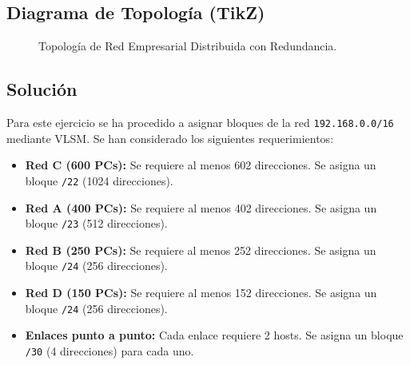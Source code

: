 \documentclass[a4paper,12pt]{article}
\begin{document}
\subsection{Diagrama de Topología (TikZ)}
\begin{figure}[H]
  \centering
  \caption{Topología de Red Empresarial Distribuida con Redundancia.}
\end{figure}

\subsection{Solución}
Para este ejercicio se ha procedido a asignar bloques de la red \texttt{192.168.0.0/16} mediante VLSM. Se han considerado los siguientes requerimientos:
\begin{itemize}
  \item \textbf{Red C (600 PCs):} Se requiere al menos 602 direcciones. Se asigna un bloque \texttt{/22} (1024 direcciones).
  \item \textbf{Red A (400 PCs):} Se requiere al menos 402 direcciones. Se asigna un bloque \texttt{/23} (512 direcciones).
  \item \textbf{Red B (250 PCs):} Se requiere al menos 252 direcciones. Se asigna un bloque \texttt{/24} (256 direcciones).
  \item \textbf{Red D (150 PCs):} Se requiere al menos 152 direcciones. Se asigna un bloque \texttt{/24} (256 direcciones).
  \item \textbf{Enlaces punto a punto:} Cada enlace requiere 2 hosts. Se asigna un bloque \texttt{/30} (4 direcciones) para cada uno.
\end{itemize}
\end{document}
